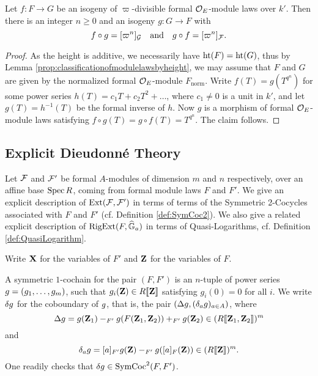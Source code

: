 \documentclass[../main.tex]{subfiles}
\begin{document}
\begin{lem}\label{lem:inverseqisog}
  Let $f\colon  F \to G$ be an isogeny of $\varpi$-divisible formal $\mathcal{O}_E$-module laws
  over $k'$. Then there is an 
  integer $n \geq 0$ and an isogeny $g\colon  G \to F$ with 
  \begin{equation*}
    f \circ g = [\varpi^n]_{\mathcal{G}} \quad \text{and} \quad g \circ f = [\varpi^n]_{\mathcal{F}}.
  \end{equation*}
  \begin{proof}[Proof]
    As the height is additive, we necessarily have 
    $\textnormal{ht}(F) = \textnormal{ht}(G)$, thus by Lemma
    \ref{prop:classificationofmodulelawsbyheight}, we may assume that $F$ and
    $G$ are given by the normalized formal $\mathcal{O}_E$-module
    $F_\mathrm{norm}$.
    Write $f(T) = g(T^{q^n})$ for some power series $h(T) = c_1 T + c_2T^2 +
    \dots$, where $c_1 \neq 0$ is a unit in $k'$, and let $g(T) = h^{-1}(T)$ be the 
    formal inverse of $h$. Now $g$ is a morphism of formal $\mathcal{O}_E$-module laws
    satisfying $f \circ g(T) = g\circ f(T) = T^{q^n}$. The claim follows.
  \end{proof}
\end{lem}


\subsection{Explicit Dieudonné Theory} %
\label{sub:Explicit Dieudonne Theory}
Let $\mathcal{F}$ and $\mathcal{F}'$ be formal $A$-modules of dimension $m$ and $n$ respectively,
over an affine base $\operatorname{Spec} R$, coming from formal module laws $F$ and $F'$. We
give an explicit description of $\operatorname{Ext}(\mathcal{F}, \mathcal{F}')$ in terms of terms of the
Symmetric 2-Cocycles associated with $F$ and $F'$ (cf. Definition
\ref{def:SymCoc2}). 
We also give a related explicit description of $\operatorname {RigExt}(F, \widehat{\mathbb{G}}_a)$ in terms of 
Quasi-Logarithms, cf. Definition \ref{def:QuasiLogarithm}. 

Write $\mathbf{X}$ for the variables of $F'$ and $\mathbf{Z}$ for the variables of $F$.
\begin{defi} \label{def:SymCoc1}
  A symmetric $1$-cochain for the pair $(F,F')$ is an $n$-tuple of power 
  series ${g} = (g_1, \dots, g_m)$, such that $g_i(\mathbf{Z}) \in R\llbracket \mathbf{Z} \rrbracket$
  satisfying $g_i(0) = 0$ for all $i$. We write $\delta {g}$ 
  for the coboundary of ${g}$, that is, the pair $(\Delta {g}, (\delta_a
  {g})_{a \in A})$,
  where
  \begin{equation*}
    \Delta {g} = {g}(\mathbf{Z}_1) -_{F'} {g}(F(\mathbf{Z}_1,\mathbf{Z}_2)) +_{F'} {g}(\mathbf{Z}_2)
    \in (R\llbracket \mathbf{Z}_1, \mathbf{Z}_2 \rrbracket)^m
  \end{equation*}
  and 
  \begin{equation*}
    \delta_a {g} = [a]_{F'} {g}(\mathbf{Z}) -_{F'} {g}([a]_F(\mathbf{Z})) \in (R \llbracket \mathbf{Z}
    \rrbracket)^m.
  \end{equation*}
  One readily checks that $\delta {g} \in \operatorname{SymCoc}^2(F, F')$. 
\end{defi}
\end{document}
